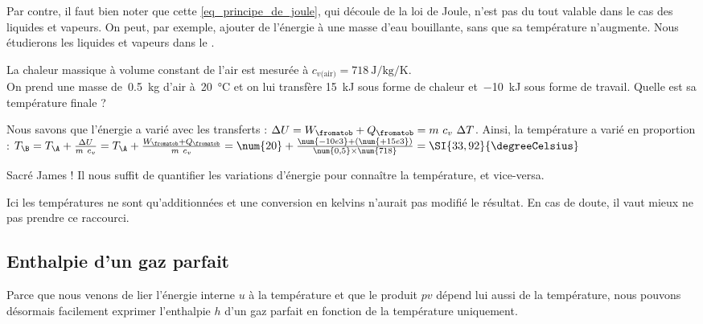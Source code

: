 		Par contre, il faut bien noter que cette \cref{eq_principe_de_joule}, qui découle de la loi de Joule, n’est pas du tout valable dans le cas des liquides et vapeurs. On peut, par exemple, ajouter de l’énergie à une masse d’eau bouillante, sans que sa température n’augmente. Nous étudierons les liquides et vapeurs dans le \courscinqshort.
		
		\begin{anexample}
			La chaleur massique à volume constant de l’air est mesurée à $c_{v\text{(air)}} = \SI{718}{\joule\per\kilogram\per\kelvin}$.\\
			On prend une masse de~\SI{0,5}{\kilogram} d’air à~\SI{20}{\degreeCelsius} et on lui transfère \SI{+15}{\kilo\joule} sous forme de chaleur et~\SI{-10}{\kilo\joule} sous forme de travail. Quelle est sa température finale ?
				\begin{answer}
					Nous savons que l’énergie a varié avec les transferts : $\Delta U = W_\fromatob + Q_\fromatob = m \ c_v \ \Delta T$. Ainsi, la température a varié en proportion : $T_\B = T_\A + \frac{\Delta U}{m \ c_v} = T_\A + \frac{W_\fromatob + Q_\fromatob}{m \ c_v} = \num{20} + \frac{\num{-10e3} + (\num{+15e3})}{\num{0,5} \times \num{718}} = \SI{33,92}{\degreeCelsius}$
				\end{answer}
					\begin{remark}Sacré James ! Il nous suffit de quantifier les variations d’énergie pour connaître la température, et vice-versa.\end{remark}
					\begin{remark}Ici les températures ne sont qu’additionnées et une conversion en \si{kelvins} n’aurait pas modifié le résultat. En cas de doute, il vaut mieux ne pas prendre ce raccourci. \end{remark}
		\end{anexample}



	\subsection{Enthalpie d’un gaz parfait}

		Parce que nous venons de lier l’énergie interne $u$ à la température et que le produit $p v$ dépend lui aussi de la température, nous pouvons désormais facilement exprimer l’enthalpie $h$ d’un gaz parfait en fonction de la température uniquement.

